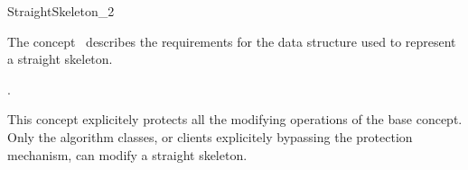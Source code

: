 
\begin{ccRefConcept}{StraightSkeleton_2}


\ccDefinition

The concept \ccRefName\ describes the requirements for the data structure used to represent a straight skeleton.

\ccRefines
{}

\ccTypes
  \ccGlue
  \ccGlue

\ccHasModels

.

This concept explicitely protects all the modifying operations of the base  concept. Only the algorithm classes, or clients explicitely bypassing the protection mechanism, can modify a straight skeleton.
 
\end{ccRefConcept}

